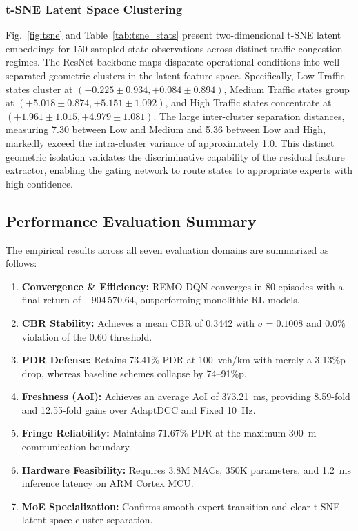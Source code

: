 \documentclass[journal]{IEEEtran}
\begin{document}
\subsubsection{t-SNE Latent Space Clustering}
Fig.~\ref{fig:tsne} and Table~\ref{tab:tsne_stats} present two-dimensional t-SNE latent embeddings for 150 sampled state observations across distinct traffic congestion regimes. The ResNet backbone maps disparate operational conditions into well-separated geometric clusters in the latent feature space. Specifically, Low Traffic states cluster at $(-0.225 \pm 0.934, +0.084 \pm 0.894)$, Medium Traffic states group at $(+5.018 \pm 0.874, +5.151 \pm 1.092)$, and High Traffic states concentrate at $(+1.961 \pm 1.015, +4.979 \pm 1.081)$. The large inter-cluster separation distances, measuring 7.30 between Low and Medium and 5.36 between Low and High, markedly exceed the intra-cluster variance of approximately 1.0. This distinct geometric isolation validates the discriminative capability of the residual feature extractor, enabling the gating network to route states to appropriate experts with high confidence.

\subsection{Performance Evaluation Summary}
The empirical results across all seven evaluation domains are summarized as follows:
\begin{enumerate}
    \item \textbf{Convergence & Efficiency:} REMO-DQN converges in 80 episodes with a final return of $-904\,570.64$, outperforming monolithic RL models.
    \item \textbf{CBR Stability:} Achieves a mean CBR of 0.3442 with $\sigma=0.1008$ and 0.0\% violation of the 0.60 threshold.
    \item \textbf{PDR Defense:} Retains 73.41\% PDR at 100~veh/km with merely a 3.13\%p drop, whereas baseline schemes collapse by 74--91\%p.
    \item \textbf{Freshness (AoI):} Achieves an average AoI of 373.21~ms, providing 8.59-fold and 12.55-fold gains over AdaptDCC and Fixed 10~Hz.
    \item \textbf{Fringe Reliability:} Maintains 71.67\% PDR at the maximum 300~m communication boundary.
    \item \textbf{Hardware Feasibility:} Requires 3.8M MACs, 350K parameters, and 1.2~ms inference latency on ARM Cortex MCU.
    \item \textbf{MoE Specialization:} Confirms smooth expert transition and clear t-SNE latent space cluster separation.
\end{enumerate}
\end{document}
